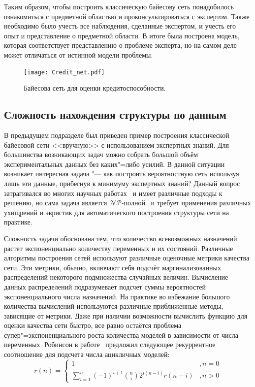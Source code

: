 Таким образом, чтобы построить классическую байесову сеть понадобилось ознакомиться с предметной областью и проконсультироваться с экспертом. 
Также необходимо было учесть все наблюдения, сделанные экспертом, и учесть его опыт и представление о предметной области.
В итоге была построена модель, которая соответствует представлению о проблеме эксперта, но на самом деле может отличаться от истинной модели проблемы.

\begin{figure}[ht]
\centering
  \texttt{[image: Credit\_net.pdf]}  
  \caption{ Байесова сеть для оценки кредитоспособности. }
  \label{fig:domain:manual_structure:credit_net}
\end{figure}


\subsection{Сложность нахождения структуры по данным}
\label{sub:domain:learning_complexity}

В предыдущем подразделе был приведен пример построения классической байесовой сети <<вручную>> с использованием экспертных знаний.
Для большинства возникающих задач можно собрать большой объём экспериментальных данных без каких"=либо усилий.
В данной ситуации возникает интересная задача "--- как построить вероятностную сеть используя лишь эти данные, прибегнув к минимуму экспертных знаний?
Данный вопрос затрагивался во многих научных работах~\cite{Lam94learningbayesian,Suzuki93,Cooper1991,terentyev_2006} и имеет различные подходы к решению, но сама задача является $\mathcal{NP}$-полной~\cite{Chickering96learningbayesian} и требует применения различных ухищрений и эвристик для автоматического построения структуры сети на практике.

Сложность задачи обоснована тем, что количество всевозможных назначений растет экспоненциально количеству переменных и их состояний.
Различные алгоритмы построения сетей используют различные оценочные метрики качества сети.
Эти метрики, обычно, включают себя подсчёт маргинализованных распределений некоторого подмножества случайных величин.
Вычисление данных распределений подразумевает подсчет суммы вероятностей экспоненциального числа назначений.
На практике во избежание большого количества вычислений используются различные приближенные методы, зависящие от метрики.
Даже при наличии возможности вычислить функцию для оценки качества сети быстро, все равно остаётся проблема супер"=экспоненциального роста количества моделей в зависимости от числа переменных.
Робинсон в работе~\cite{robinson_1977} предложил следующее рекуррентное соотношение для подсчета числа ацикличных моделей:
\begin{equation}
  r (n) =
  \begin{cases}
      1 &, n = 0 \\
      \sum_{i = 1}^{n} (-1)^{i+1} \binom{n}{i} 2^{i(n-i)} r(n - i) &, n > 0 
  \end{cases} %
\end{equation}

